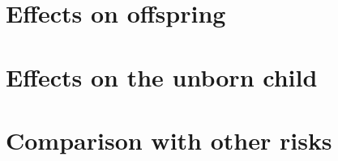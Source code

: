 \section{Effects on offspring}
\section{Effects on the unborn child}
\section{Comparison with other risks}